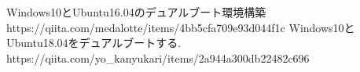\documentclass[11pt,a4paper]{jsarticle}
\begin{document}
%


\begin{thebibliography}{99}
 Windows10とUbuntu16.04のデュアルブート環境構築\\https://qiita.com/medalotte/items/4bb5cfa709e93d044f1c
 Windows10とUbuntu18.04をデュアルブートする.\\https://qiita.com/yo\_kanyukari/items/2a944a300db22482c696
\end{thebibliography}%
%
\end{document}
